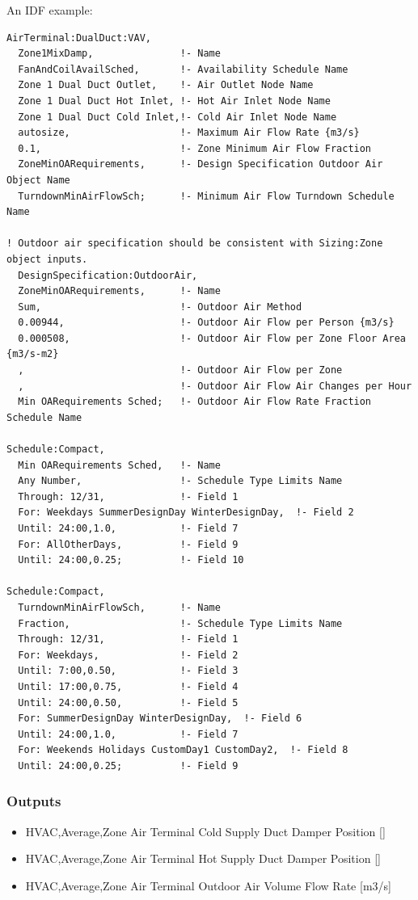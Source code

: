 An IDF example:

\begin{lstlisting}
AirTerminal:DualDuct:VAV,
  Zone1MixDamp,               !- Name
  FanAndCoilAvailSched,       !- Availability Schedule Name
  Zone 1 Dual Duct Outlet,    !- Air Outlet Node Name
  Zone 1 Dual Duct Hot Inlet, !- Hot Air Inlet Node Name
  Zone 1 Dual Duct Cold Inlet,!- Cold Air Inlet Node Name
  autosize,                   !- Maximum Air Flow Rate {m3/s}
  0.1,                        !- Zone Minimum Air Flow Fraction
  ZoneMinOARequirements,      !- Design Specification Outdoor Air Object Name
  TurndownMinAirFlowSch;      !- Minimum Air Flow Turndown Schedule Name

! Outdoor air specification should be consistent with Sizing:Zone object inputs.
  DesignSpecification:OutdoorAir,
  ZoneMinOARequirements,      !- Name
  Sum,                        !- Outdoor Air Method
  0.00944,                    !- Outdoor Air Flow per Person {m3/s}
  0.000508,                   !- Outdoor Air Flow per Zone Floor Area {m3/s-m2}
  ,                           !- Outdoor Air Flow per Zone
  ,                           !- Outdoor Air Flow Air Changes per Hour
  Min OARequirements Sched;   !- Outdoor Air Flow Rate Fraction Schedule Name

Schedule:Compact,
  Min OARequirements Sched,   !- Name
  Any Number,                 !- Schedule Type Limits Name
  Through: 12/31,             !- Field 1
  For: Weekdays SummerDesignDay WinterDesignDay,  !- Field 2
  Until: 24:00,1.0,           !- Field 7
  For: AllOtherDays,          !- Field 9
  Until: 24:00,0.25;          !- Field 10

Schedule:Compact,
  TurndownMinAirFlowSch,      !- Name
  Fraction,                   !- Schedule Type Limits Name
  Through: 12/31,             !- Field 1
  For: Weekdays,              !- Field 2
  Until: 7:00,0.50,           !- Field 3
  Until: 17:00,0.75,          !- Field 4
  Until: 24:00,0.50,          !- Field 5
  For: SummerDesignDay WinterDesignDay,  !- Field 6
  Until: 24:00,1.0,           !- Field 7
  For: Weekends Holidays CustomDay1 CustomDay2,  !- Field 8
  Until: 24:00,0.25;          !- Field 9
\end{lstlisting}

\subsubsection{Outputs}\label{outputs-13}

\begin{itemize}
\item
  HVAC,Average,Zone Air Terminal Cold Supply Duct Damper Position {[]}
\item
  HVAC,Average,Zone Air Terminal Hot Supply Duct Damper Position {[]}
\item
  HVAC,Average,Zone Air Terminal Outdoor Air Volume Flow Rate {[}m3/s{]}
\end{itemize}

